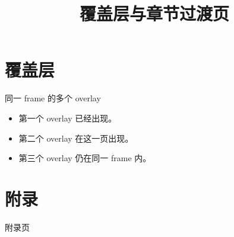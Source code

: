 \documentclass[aspectratio=169,11pt,fontset=none]{ctexbeamer}
\title[覆盖层]{覆盖层与章节过渡页}
\begin{document}
\OutlineSlide
\section{覆盖层}
\begin{frame}{同一 frame 的多个 overlay}
  \begin{itemize}
    \item<1-> 第一个 overlay 已经出现。
    \item<2-> 第二个 overlay 在这一页出现。
    \item<3-> 第三个 overlay 仍在同一 frame 内。
  \end{itemize}
\end{frame}
\section{附录}
\begin{frame}{附录页}
\end{frame}
\end{document}
